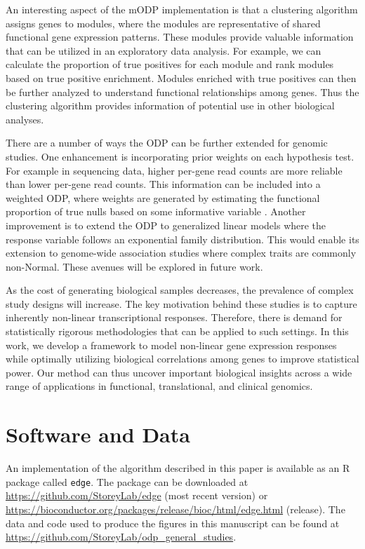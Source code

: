 \documentclass[11pt]{article}
\begin{document}
An interesting aspect of the mODP implementation is that a clustering algorithm assigns genes to modules, where the modules are representative of shared functional gene expression patterns. These modules provide valuable information that can be utilized in an exploratory data analysis. For example, we can calculate the proportion of true positives for each module and rank modules based on true positive enrichment. Modules enriched with true positives can then be further analyzed to understand functional relationships among genes. Thus the clustering algorithm provides information of potential use in other biological analyses.

There are a number of ways the ODP can be further extended for genomic studies. One enhancement is incorporating prior weights on each hypothesis test. For example in sequencing data, higher per-gene read counts are more reliable than lower per-gene read counts. This information can be included into a weighted ODP, where weights are generated by estimating the functional proportion of true nulls based on some informative variable \cite{chen2017}. Another improvement is to extend the ODP to generalized linear models where the response variable follows an exponential family distribution. This would enable its extension to genome-wide association studies where complex traits are commonly non-Normal. These avenues will be explored in future work.

As the cost of generating biological samples decreases, the prevalence of complex study designs will increase. The key motivation behind these studies is to capture inherently non-linear transcriptional responses. Therefore, there is demand for statistically rigorous methodologies that can be applied to such settings. In this work, we develop a framework to model non-linear gene expression responses while optimally utilizing biological correlations among genes to improve statistical power. Our method can thus uncover important biological insights across a wide range of applications in functional, translational, and clinical genomics.

\section{Software and Data\label{Sec:sdata}}

An implementation of the algorithm described in this paper is available as an R package called \texttt{edge}. The package can be downloaded at \url{https://github.com/StoreyLab/edge} (most recent version) or \url{https://bioconductor.org/packages/release/bioc/html/edge.html} (release). The data and code used to produce the figures in this manuscript can be found at \url{https://github.com/StoreyLab/odp_general_studies}.
\end{document}
